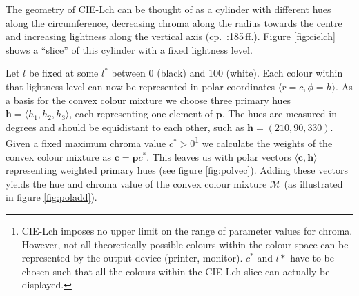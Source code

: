 \documentclass[parskip=half]{scrartcl}
\begin{document}
\begin{appendix}
The geometry of CIE-Lch can be thought of as a cylinder with different hues along the circumference, decreasing chroma along the radius towards the centre and increasing lightness along the vertical axis (cp.~\cite{Fairchild2005}:185\,ff.). Figure \ref{fig:cielch} shows a \enquote{slice} of this cylinder with a fixed lightness level.

Let $l$ be fixed at some $l^*$ between 0 (black) and 100 (white). Each colour within that lightness level can now be represented in polar coordinates $\langle r = c, \phi = h \rangle$. As a basis for the convex colour mixture we choose three primary hues $\textbf{h} = \langle h_1, h_2, h_3 \rangle$, each representing one element of $\textbf{p}$. The hues are measured in degrees and should be equidistant to each other, such as $\textbf{h}=(210, 90, 330)$. Given a fixed maximum chroma value $c^* > 0$\footnote{
  CIE-Lch imposes no upper limit on the range of parameter values for chroma. However, not all theoretically possible colours within the colour space can be represented by the output device (printer, monitor). $c^*$ and $l*$ have to be chosen such that all the colours within the CIE-Lch slice can actually be displayed.
}
we calculate the weights of the convex colour mixture as $\textbf{c}=\textbf{p}c^*$. This leaves us with polar vectors $\langle \textbf{c}, \textbf{h} \rangle$ representing weighted primary hues (see figure \ref{fig:polvec}). Adding these vectors yields the hue and chroma value of the convex colour mixture $\mathscr{M}$ (as illustrated in figure \ref{fig:poladd}).


\end{appendix}
\end{document}
